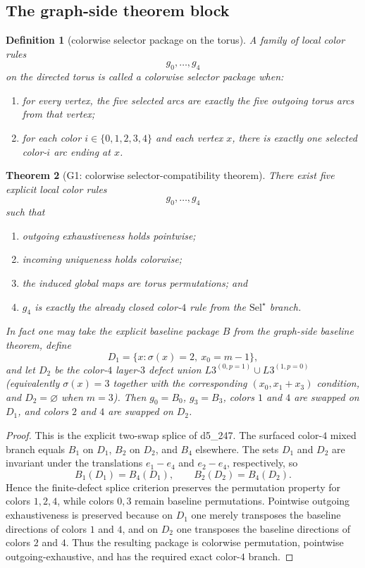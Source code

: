 \documentclass[11pt]{article}
\newtheorem{theorem}{Theorem}[section]
\newtheorem{definition}[theorem]{Definition}
\newcommand{\SelStar}{\mathrm{Sel}^{\star}}
\begin{document}
\subsection{The graph-side theorem block}

\begin{definition}[colorwise selector package on the torus]
A family of local color rules
\[
g_0,\dots,g_4
\]
on the directed torus is called a \emph{colorwise selector package} when:
\begin{enumerate}[label=\textup{(\arabic*)},leftmargin=2.8em]
\item for every vertex, the five selected arcs are exactly the five outgoing
      torus arcs from that vertex;
\item for each color $i\in\{0,1,2,3,4\}$ and each vertex $x$, there is exactly
      one selected color-$i$ arc ending at $x$.
\end{enumerate}
\end{definition}

\begin{theorem}[G1: colorwise selector-compatibility theorem]
\label{fr:G1}
There exist five explicit local color rules
\[
g_0,\dots,g_4
\]
such that
\begin{enumerate}[label=\textup{(\arabic*)},leftmargin=2.8em]
\item outgoing exhaustiveness holds pointwise;
\item incoming uniqueness holds colorwise;
\item the induced global maps are torus permutations; and
\item \(g_4\) is exactly the already closed color-$4$ rule from the
      \(\SelStar\) branch.
\end{enumerate}
In fact one may take the explicit baseline package \(B\) from the graph-side
baseline theorem, define
\[
D_1=\{x:\sigma(x)=2,\ x_0=m-1\},
\]
and let \(D_2\) be the color-$4$ layer-$3$ defect union
\(L3^{(0,p=1)}\cup L3^{(1,p=0)}\) (equivalently
\(\sigma(x)=3\) together with the corresponding \((x_0,x_1+x_3)\) condition,
and \(D_2=\varnothing\) when \(m=3\)).
Then \(g_0=B_0\), \(g_3=B_3\), colors \(1\) and \(4\) are swapped on \(D_1\),
and colors \(2\) and \(4\) are swapped on \(D_2\).
\end{theorem}

\begin{proof}
This is the explicit two-swap splice of d5\_247.
The surfaced color-$4$ mixed branch equals \(B_1\) on \(D_1\), \(B_2\) on \(D_2\),
and \(B_4\) elsewhere.
The sets \(D_1\) and \(D_2\) are invariant under the translations
\(e_1-e_4\) and \(e_2-e_4\), respectively, so
\[
B_1(D_1)=B_4(D_1),
\qquad
B_2(D_2)=B_4(D_2).
\]
Hence the finite-defect splice criterion preserves the permutation property for
colors \(1,2,4\), while colors \(0,3\) remain baseline permutations.
Pointwise outgoing exhaustiveness is preserved because on \(D_1\) one merely
transposes the baseline directions of colors \(1\) and \(4\), and on \(D_2\) one
transposes the baseline directions of colors \(2\) and \(4\).
Thus the resulting package is colorwise permutation, pointwise outgoing-exhaustive,
and has the required exact color-$4$ branch.
\end{proof}
\end{document}
